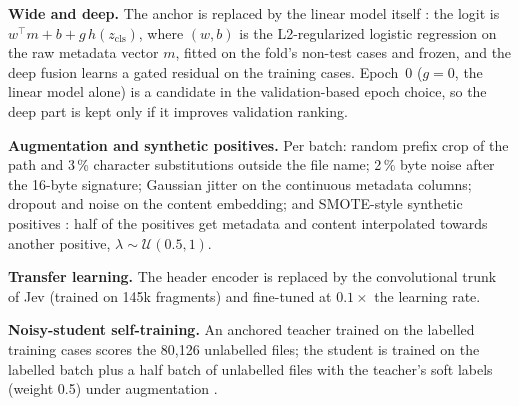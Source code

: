 \documentclass[conference]{IEEEtran}
\begin{document}
\textbf{Wide and deep.} The anchor is replaced by the linear model itself \cite{cheng2016}: the logit is
$w^\top m + b + g\,h(z_{\text{cls}})$, where $(w,b)$ is the L2-regularized logistic regression on the raw metadata
vector $m$, fitted on the fold's non-test cases and frozen, and the deep fusion learns a gated residual on the training
cases. Epoch~0 ($g=0$, the linear model alone) is a candidate in the validation-based epoch choice, so the deep part is
kept only if it improves validation ranking.

\textbf{Augmentation and synthetic positives.} Per batch: random prefix crop of the path and 3\,\% character
substitutions outside the file name; 2\,\% byte noise after the 16-byte signature; Gaussian jitter on the continuous
metadata columns; dropout and noise on the content embedding; and SMOTE-style synthetic positives \cite{chawla2002}:
half of the positives get metadata and content interpolated towards another positive,
$\lambda\sim\mathcal{U}(0.5,1)$.

\textbf{Transfer learning.} The header encoder is replaced by the convolutional trunk of Jev (trained on 145k
fragments) and fine-tuned at $0.1\times$ the learning rate.

\textbf{Noisy-student self-training.} An anchored teacher trained on the labelled training cases scores the 80{,}126
unlabelled files; the student is trained on the labelled batch plus a half batch of unlabelled files with the
teacher's soft labels (weight 0.5) under augmentation \cite{xie2020}.
\end{document}
